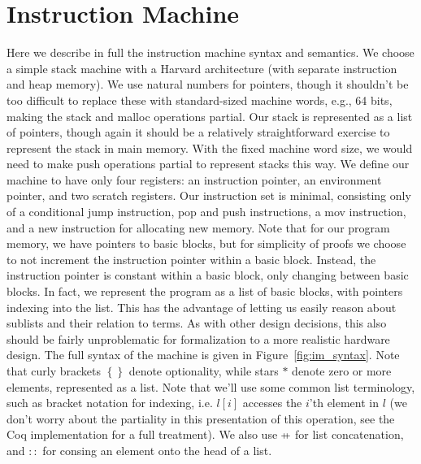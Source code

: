 \section{Instruction Machine} \label{sec:im_semantics}

Here we describe in full the instruction machine syntax and semantics. We
choose a simple stack machine with a Harvard architecture (with separate
instruction and heap memory). We use natural numbers for pointers, though it
shouldn't be too difficult to replace these with standard-sized machine words,
e.g., 64 bits, making the stack and malloc operations partial. Our stack is
represented as a list of pointers, though again it should be a relatively
straightforward exercise to represent the stack in main memory. With the fixed
machine word size, we would need to make push operations partial to represent
stacks this way. We define our machine to have only four registers: an
instruction pointer, an environment pointer, and two scratch registers. Our
instruction set is minimal, consisting only of a conditional jump instruction,
pop and push instructions, a mov instruction, and a new instruction for
allocating new memory. Note that for our program memory, we have pointers to
basic blocks, but for simplicity of proofs we choose to not increment the
instruction pointer within a basic block.  Instead, the instruction pointer is
constant within a basic block, only changing between basic blocks. In fact, we
represent the program as a list of basic blocks, with pointers indexing into the
list. This has the advantage of letting us easily reason about sublists and
their relation to terms. As with other design decisions, this also should be
fairly unproblematic for formalization to a more realistic hardware design. The
full syntax of the machine is given in Figure~\ref{fig:im_syntax}. Note that
curly brackets $\left\{\right\}$ denote optionality, while stars $*$ denote zero
or more elements, represented as a list. Note that we'll use some common list
terminology, such as bracket notation for indexing, i.e. $l\left[i\right]$ accesses the
$i$'th element in $l$ (we don't worry about the partiality in this presentation
of this operation, see the Coq implementation for a full treatment). We also use
$\concat$ for list concatenation, and $::$ for consing an element onto the head
of a list. 

